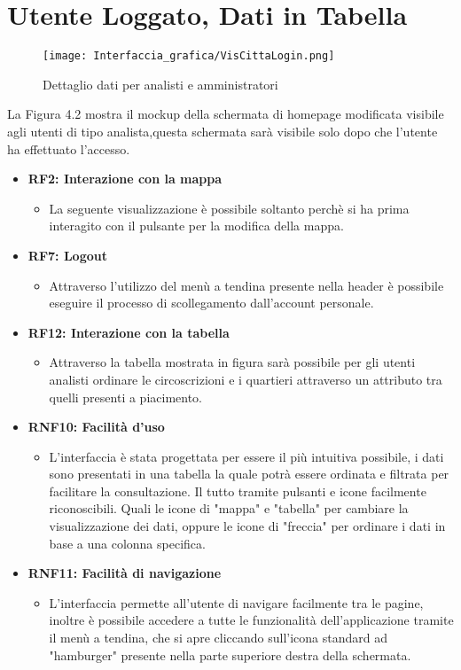 \newpage
\section{Utente Loggato, Dati in Tabella}

    \begin{figure}[H]
        \center
        \texttt{[image: Interfaccia\_grafica/VisCittaLogin.png]}
        \caption{Dettaglio dati per analisti e amministratori}
    \end{figure}    

    La Figura 4.2 mostra il mockup della schermata di homepage modificata visibile agli utenti di tipo analista,questa schermata sarà visibile solo dopo che l'utente ha effettuato l'accesso.

    
    \begin{itemize}
        \item \textbf{RF2: Interazione con la mappa} \begin{itemize}
            \item La seguente visualizzazione è possibile soltanto perchè si ha prima interagito con il pulsante per la modifica della mappa.
        \end{itemize}
        \item \textbf{RF7: Logout} \begin{itemize} 
            \item Attraverso l'utilizzo del menù a tendina presente nella header è possibile eseguire il processo di scollegamento dall'account personale.
        \end{itemize}
        \item \textbf{RF12: Interazione con la tabella} \begin{itemize} 
            \item Attraverso la tabella mostrata in figura sarà possibile per gli utenti analisti ordinare le circoscrizioni e i quartieri attraverso un attributo tra quelli presenti a piacimento.
        \end{itemize}
        \item \textbf{RNF10: Facilità d'uso} \begin{itemize}
            \item L'interfaccia è stata progettata per essere il più intuitiva possibile, i dati sono presentati in una tabella la quale potrà essere ordinata e filtrata per facilitare la consultazione. Il tutto tramite pulsanti e icone facilmente riconoscibili. Quali le icone di "mappa" e "tabella" per cambiare la visualizzazione dei dati, oppure le icone di "freccia" per ordinare i dati in base a una colonna specifica.
        \end{itemize}
        \item \textbf{RNF11: Facilità di navigazione} \begin{itemize}
            \item L'interfaccia permette all'utente di navigare facilmente tra le pagine, inoltre è possibile accedere a tutte le funzionalità dell'applicazione tramite il menù a tendina, che si apre cliccando sull'icona standard ad "hamburger" presente nella parte superiore destra della schermata.
            \end{itemize}
    \end{itemize}

